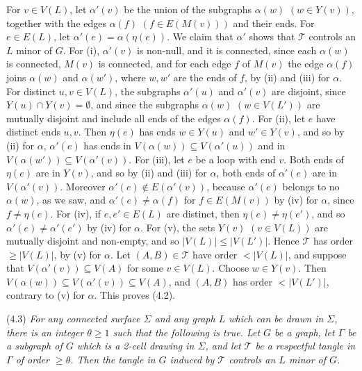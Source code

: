 {For $v \in V(L)$, let $\alpha'(v)$ be the union of the subgraphs $\alpha(w)$ $(w \in Y(v))$, together with the edges $\alpha(f)$ $(f \in E(M(v)))$ and their ends. For $e \in E(L)$, let $\alpha'(e) = \alpha(\eta(e))$. We claim that $\alpha'$ shows that $\mathscr{T}$ controls an $L$ minor of $G$. For (i), $\alpha'(v)$ is non-null, and it is connected, since each $\alpha(w)$ is connected, $M(v)$ is connected, and for each edge $f$ of $M(v)$ the edge $\alpha(f)$ joins $\alpha(w)$ and $\alpha(w')$, where $w, w'$ are the ends of $f$, by (ii) and (iii) for $\alpha$. For distinct $u, v \in V(L)$, the subgraphs $\alpha'(u)$ and $\alpha'(v)$ are disjoint, since $Y(u) \cap Y(v) = \emptyset$, and since the subgraphs $\alpha(w)$ $(w \in V(L'))$ are mutually disjoint and include all ends of the edges $\alpha(f)$. For (ii), let $e$ have distinct ends $u, v$. Then $\eta(e)$ has ends $w \in Y(u)$ and $w' \in Y(v)$, and so by (ii) for $\alpha$, $\alpha'(e)$ has ends in $V(\alpha(w)) \subseteq V(\alpha'(u))$ and in $V(\alpha(w')) \subseteq V(\alpha'(v))$. For (iii), let $e$ be a loop with end $v$. Both ends of $\eta(e)$ are in $Y(v)$, and so by (ii) and (iii) for $\alpha$, both ends of $\alpha'(e)$ are in $V(\alpha'(v))$. Moreover $\alpha'(e) \notin E(\alpha'(v))$, because $\alpha'(e)$ belongs to no $\alpha(w)$, as we saw, and $\alpha'(e) \ne \alpha(f)$ for $f \in E(M(v))$ by (iv) for $\alpha$, since $f \ne \eta(e)$. For (iv), if $e, e' \in E(L)$ are distinct, then $\eta(e) \ne \eta(e')$, and so $\alpha'(e) \ne \alpha'(e')$ by (iv) for $\alpha$. For (v), the sets $Y(v)$ $(v \in V(L))$ are mutually disjoint and non-empty, and so $|V(L)| \le |V(L')|$. Hence $\mathscr{T}$ has order $\ge |V(L)|$, by (v) for $\alpha$. Let $(A, B) \in \mathscr{T}$ have order $< |V(L)|$, and suppose that $V(\alpha'(v)) \subseteq V(A)$ for some $v \in V(L)$. Choose $w \in Y(v)$. Then $V(\alpha(w)) \subseteq V(\alpha'(v)) \subseteq V(A)$, and $(A, B)$ has order $< |V(L')|$, contrary to (v) for $\alpha$. This proves (4.2).}

\stmt
(4.3) \textit{For any connected surface $\Sigma$ and any graph $L$ which can be drawn in $\Sigma$, there is an integer $\theta \ge 1$ such that the following is true. Let $G$ be a graph, let $\Gamma$ be a subgraph of $G$ which is a 2-cell drawing in $\Sigma$, and let $\mathscr{T}$ be a respectful tangle in $\Gamma$ of order $\ge \theta$. Then the tangle in $G$ induced by $\mathscr{T}$ controls an $L$ minor of $G$.}

